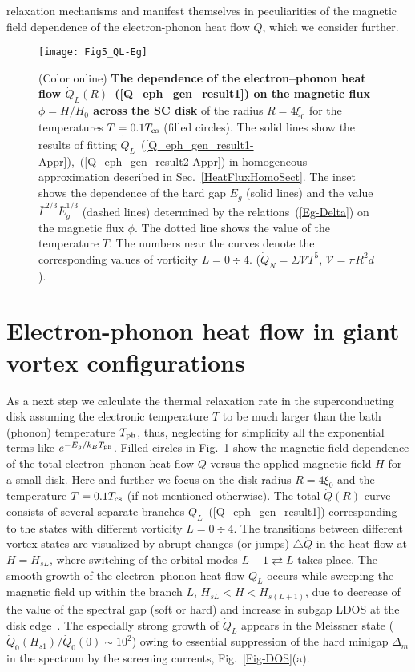 \documentclass[prx,twocolumn,aps,superscriptaddress,showpacs,amsmath,amssymb,footnoteinbib]{revtex4-1}
\begin{document}
relaxation mechanisms and manifest themselves in peculiarities of
the magnetic field dependence of the electron-phonon heat flow
$\dot{Q}$, which we consider further.
%
\begin{figure}[t]
\texttt{[image: Fig5\_QL-Eg]}
\caption{(Color online) \textbf{The dependence of the
electron--phonon heat flow $\dot{Q}_L(R)$~(\ref{Q_eph_gen_result1}) %
on the magnetic flux  $\phi = H / H_0$ across the SC disk} of the
radius $R = 4 \xi_0$ for the temperatures $T = 0. 1 T_{\rm cs}$
(filled circles). The solid lines show the results of fitting
$\dot{\bar{Q}}_L$~(\ref{Q_eph_gen_result1-Appr}),~(\ref{Q_eph_gen_result2-Appr})
in homogeneous approximation described in
Sec.~\ref{HeatFluxHomoSect}. The inset shows the dependence of the
hard gap $\bar{E}_g$ (solid lines) and the value
$\bar{\Gamma}^{2/3} \bar{E}_g^{1/3}$ (dashed lines) determined by
the relations~(\ref{Eg-Delta}) on the magnetic flux $\phi$. The
dotted line shows the value of the temperature $T$. The numbers
near the curves denote the corresponding values of vorticity $L =
0 \div 4$. ($\dot{Q}_N = \Sigma \mathcal{V} T^5$, $\mathcal{V} =
\pi R^2 d$).} \label{Fig4-Q(H)}
\end{figure}
%

\section{Electron-phonon heat flow in giant vortex configurations} \label{E-PhHeatFlux}

As a next step we calculate the thermal relaxation rate in the
superconducting disk assuming the electronic temperature $T$ to be
much larger than the bath (phonon) temperature $T_{\rm ph}$, thus,
neglecting for simplicity all the exponential terms like
$e^{-E_g/k_B T_{\rm ph}}$. Filled circles in Fig.~\ref{Fig4-Q(H)}
show the magnetic field dependence of the total electron--phonon
heat flow $\dot{Q}$ versus the applied magnetic field $H$ for a
small disk. Here and further we focus on the disk radius $R = 4
\xi_0$ and the temperature $T = 0.1 T_{\rm cs}$ (if not mentioned
otherwise). The total $\dot{Q}(R)$ curve consists of several
separate branches $\dot{Q}_L$~(\ref{Q_eph_gen_result1})
corresponding to the states with different vorticity $L = 0 \div
4$. The transitions between different vortex states are visualized
by abrupt changes (or jumps) $\triangle\dot{Q}$ in the heat flow
at $H = H_{sL}$, where switching of the orbital modes $L - 1
\rightleftarrows L$ takes place. The smooth growth of the
electron--phonon heat flow $\dot{Q}_L$ occurs while sweeping the
magnetic field up within the branch $L$, $H_{sL} < H <
H_{s(L+1)}$, due to decrease of the value of the spectral gap
(soft or hard) and increase in subgap LDOS at the disk
edge~\cite{Samokhvalov-PRB19-DOS}. The especially strong growth of
$\dot{Q}_L$ appears in the Meissner state ($\dot{Q}_0(H_{s1}) /
\dot{Q}_0(0) \sim 10^2$) owing to essential suppression of the
hard minigap $\Delta_m$ in the spectrum by the screening currents,
Fig.~\ref{Fig-DOS}(a).
\end{document}
